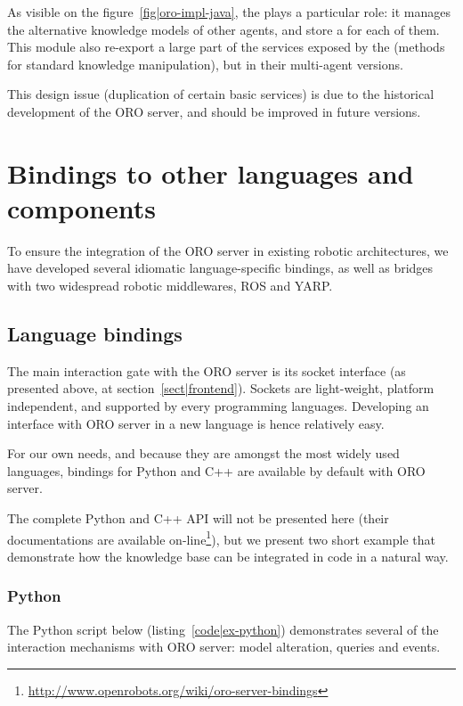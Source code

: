 As visible on the figure~\ref{fig|oro-impl-java}, the 
plays a particular role: it manages the alternative knowledge models of other
agents, and store a  for each of them. This module
also re-export a large part of the services exposed by the 
(methods for standard knowledge manipulation), but in their multi-agent
versions.

This design issue (duplication of certain basic services) is due to the
historical development of the ORO server, and should be improved in future
versions.

\section{Bindings to other languages and components}
\label{sect|interfacing}

To ensure the integration of the ORO server in existing robotic architectures, we
have developed several idiomatic language-specific bindings, as well as bridges
with two widespread robotic middlewares, ROS and YARP.

\subsection{Language bindings}
\label{sect|bindings}

The main interaction gate with the ORO server is its socket interface (as
presented above, at section~\ref{sect|frontend}). Sockets are light-weight,
platform independent, and supported by every programming languages.  Developing
an interface with ORO server in a new language is hence relatively easy.

For our own needs, and because they are amongst the most widely used languages,
bindings for Python and C++ are available by default with ORO server.

The complete Python and C++ API will not be presented here (their
documentations are available
on-line\footnote{\url{http://www.openrobots.org/wiki/oro-server-bindings}}),
but we present two short example that demonstrate how the knowledge base can be
integrated in code in a natural way.

\subsubsection{Python}
\label{sect|python-bindings}

The Python script below (listing~\ref{code|ex-python}) demonstrates several of
the interaction mechanisms with ORO server: model alteration, queries and events.


